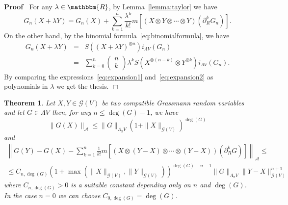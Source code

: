 \documentclass[11pt]{article}
\newenvironment{proof}{\noindent\textbf{Proof\ }}{\hspace*{\fill}$\Box$\medskip}
\newtheorem{theorem}{Theorem}
\begin{document}
\begin{proof}
  For any $\lambda \in \mathbbm{R}$, by Lemma~\ref{lemma:taylor} we have
  \begin{equation}
    G_n (X + \lambda Y) = G_n (X) + \sum_{k = 1}^n \frac{\lambda^k}{k!} m [(X
    \otimes Y \otimes \cdots \otimes Y) (\partial_R^k G_n)] .
    \label{eq:expansion1}
  \end{equation}
  On the other hand, by the binomial formula~{\eqref{eq:binomialformula}}, we
  have
  \begin{eqnarray}
    G_n (X + \lambda Y) & = & S ((X + \lambda Y)^{\otimes n}) i_{\Lambda V}
    (G_n) \nonumber\\
    & = & \sum_{k = 0}^n \left( \begin{array}{c}
      n\\
      k
    \end{array} \right) \lambda^k S (X^{\otimes (n - k)} \otimes Y^{\otimes
    k}) i_{\Lambda V} (G_n) .  \label{eq:expansion2}
  \end{eqnarray}
  By comparing the expressions~{\eqref{eq:expansion1}}
  and~{\eqref{eq:expansion2}} as polynomials in $\lambda$ we get the thesis.
\end{proof}

\begin{theorem}
  \label{theorem_function1}Let $X, Y \in \mathcal{G} (V)$ be two compatible
  Grassmann random variables and let $G \in \Lambda V$ then, for any $n
  \leqslant \deg (G) - 1$, we have
  \begin{equation}
    \| G (X) \|_{\mathcal{A}} \leqslant \| G \|_{\Lambda_{\pi} V} (1 + \| X
    \|_{\mathcal{G} (V)})^{\deg (G)} \label{eq:localbound}
  \end{equation}
  and
  \begin{equation}
    \begin{array}{c}
      \left\| G (Y) - G (X) - \sum_{k = 1}^n \frac{1}{k!} m [(X \otimes (Y -
      X) \otimes \cdots \otimes (Y - X)) (\partial_R^k G)]
      \right\|_{\mathcal{A}} \leqslant\\
      \leqslant C_{n, \deg (G)} (1 + \max (\| X \|_{\mathcal{G} (V)}, \| Y
      \|_{\mathcal{G} (V)}))^{\deg (G) - n - 1} \| G \|_{\Lambda_{\pi} V} \| Y
      - X \|_{\mathcal{G} (V)}^{n + 1}
    \end{array} \label{eq:locallip}
  \end{equation}
  where $C_{n, \deg (G)} > 0$ is a suitable constant depending only on $n$ and
  $\deg (G)$. In the case $n = 0$ we can choose $C_{0, \deg (G)} = \deg (G)$.
\end{theorem}
\end{document}
